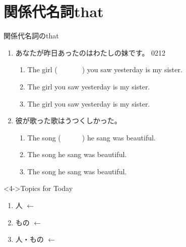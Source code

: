 \documentclass[aspectratio=169,xcolor={dvipsnames,table}]{beamer}
\begin{document}
\section{関係代名詞that }
\begin{frame}[plain,t]{関係代名詞のthat}
 \begin{enumerate}
  \item<1-> あなたが昨日あったのはわたしの妹です。%
\hfill{\tiny 0212}\,{\scriptsize {}}
       \begin{enumerate}
	\item<1-> The girl (~~~~~~~) you saw yesterday is my sister.
	\item<2->  The girl  you saw yesterday is my sister.
	\item<5->  The girl  you saw yesterday is my sister.
	\end{enumerate}
  \item<1-> 彼が歌った歌はうつくしかった。
	\begin{enumerate}
	 \item<1-> The song (~~~~~~) he sang was beautiful.
	 \item<3-> The song  he sang was beautiful.
	 \item<6-> The song  he sang was beautiful.
       \end{enumerate}
 \end{enumerate}

\begin{block}<4->{Topics for Today}
\small
 
\begin{enumerate}\small
 \item<4->  人\,\,$\longleftarrow$\,\,
 \item<4->  もの\,\,$\longleftarrow$\,\,
 \item<7->  人・もの\,\,$\longleftarrow$\,\,
 \end{enumerate}

\hfill{}
     \end{block}
\end{frame}
\end{document}
